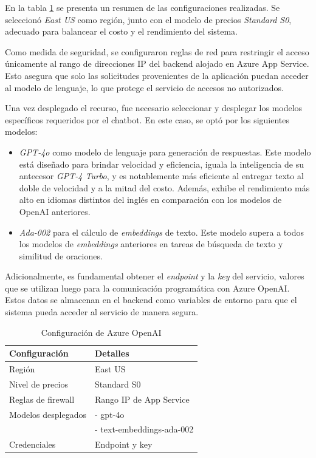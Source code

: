 En la tabla \ref{tab:config-openai} se presenta un resumen de las configuraciones realizadas. 
Se seleccionó \textit{East US} como región, junto con el modelo de precios \textit{Standard S0}, 
adecuado para balancear el costo y el rendimiento del sistema.

Como medida de seguridad, se configuraron reglas de red para restringir el acceso únicamente al rango 
de direcciones IP del backend alojado en Azure App Service. Esto asegura que solo las solicitudes provenientes de la 
aplicación puedan acceder al modelo de lenguaje, lo que protege el servicio de accesos no autorizados.

Una vez desplegado el recurso, fue necesario seleccionar y desplegar los modelos específicos requeridos por el chatbot. 
En este caso, se optó por los siguientes modelos:

\begin{itemize}
	\item \textit{GPT-4o} como modelo de lenguaje para generación de respuestas. Este modelo está diseñado para brindar velocidad 
  y eficiencia, iguala la inteligencia de su antecesor \textit{GPT-4 Turbo}, y es notablemente más eficiente al entregar texto al 
  doble de velocidad y a la mitad del costo. Además, exhibe el rendimiento más alto en idiomas distintos del inglés en comparación 
  con los modelos de OpenAI anteriores.
	\item \textit{Ada-002} para el cálculo de \textit{embeddings} de texto. Este modelo supera a todos los modelos de \textit{embeddings} 
  anteriores en tareas de búsqueda de texto y similitud de oraciones.
\end{itemize}

Adicionalmente, es fundamental obtener el \textit{endpoint} y la \textit{key} del servicio, valores que se utilizan luego para la comunicación programática 
con Azure OpenAI. Estos datos se almacenan en el backend como variables de entorno para que el sistema pueda acceder al servicio de manera segura.

\begin{table}[h]
	\centering
	\caption[Configuración de Azure OpenAI]{Configuración de Azure OpenAI}
	\begin{tabular}{l l}    
		\toprule
		\textbf{Configuración} 	 & \textbf{Detalles} 	     \\
		\midrule
		Región                   &	East US 				 \\		
		Nivel de precios         & Standard S0				 \\
		Reglas de firewall       & Rango IP de App Service   \\
        Modelos desplegados	     & - gpt-4o				     \\
            	                 & - text-embeddings-ada-002 \\
        Credenciales	         & Endpoint y key 		     \\
		\bottomrule
		\hline
	\end{tabular}
	\label{tab:config-openai}
\end{table}


